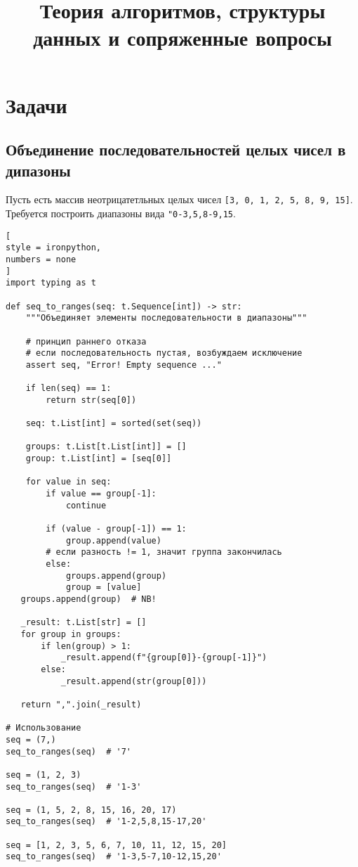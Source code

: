 \documentclass[%
	11pt,
	a4paper,
	utf8,
		]{article}
\begin{document}
\title{Теория алгоритмов, структуры данных и сопряженные вопросы}

\author{}

\date{}
\maketitle

\thispagestyle{fancy}

\tableofcontents

\section{Задачи}

\subsection{Объединение последовательностей целых чисел в дипазоны}

Пусть есть массив неотрицатетльных целых чисел \verb|[3, 0, 1, 2, 5, 8, 9, 15]|. Требуется построить диапазоны вида \verb|"0-3,5,8-9,15|.

\begin{lstlisting}[
style = ironpython,
numbers = none
]
import typing as t

def seq_to_ranges(seq: t.Sequence[int]) -> str:
    """Объединяет элементы последовательности в диапазоны"""
    
    # принцип раннего отказа
    # если последовательность пустая, возбуждаем исключение
    assert seq, "Error! Empty sequence ..."
    
    if len(seq) == 1:
        return str(seq[0])
    
    seq: t.List[int] = sorted(set(seq))
    
    groups: t.List[t.List[int]] = []
    group: t.List[int] = [seq[0]]
    
    for value in seq:
        if value == group[-1]:
            continue
            
        if (value - group[-1]) == 1:
            group.append(value)
        # если разность != 1, значит группа закончилась
        else:
            groups.append(group)
            group = [value]
   groups.append(group)  # NB! 
            
   _result: t.List[str] = []
   for group in groups:
       if len(group) > 1:
           _result.append(f"{group[0]}-{group[-1]}")
       else:
           _result.append(str(group[0]))
   
   return ",".join(_result)

# Использование
seq = (7,)
seq_to_ranges(seq)  # '7'

seq = (1, 2, 3)
seq_to_ranges(seq)  # '1-3'

seq = (1, 5, 2, 8, 15, 16, 20, 17)
seq_to_ranges(seq)  # '1-2,5,8,15-17,20'

seq = [1, 2, 3, 5, 6, 7, 10, 11, 12, 15, 20]
seq_to_ranges(seq)  # '1-3,5-7,10-12,15,20'
\end{lstlisting}
\end{document}
